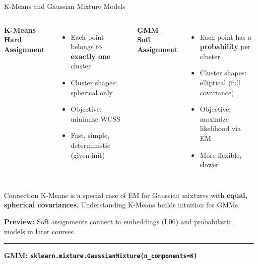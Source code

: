 \documentclass[8pt,aspectratio=169]{beamer}
\newcommand{\bottomnote}[1]{%
\vfill
\vspace{-2mm}
\textcolor{mllavender2}{\rule{\textwidth}{0.4pt}}
\vspace{1mm}
\footnotesize
\textbf{#1}
}
\newenvironment{compactlist}{%
  \begin{itemize}%
    \setlength{\itemsep}{2pt}%
    \setlength{\parskip}{0pt}%
    \setlength{\parsep}{0pt}%
}{%
  \end{itemize}%
}
\newcommand{\highlight}[1]{\textcolor{mlorange}{\textbf{#1}}}
\begin{document}
\begin{frame}[t]{K-Means and Gaussian Mixture Models}
\begin{columns}[T]
\small
\textbf{K-Means = Hard Assignment}

\footnotesize
\begin{compactlist}
\item \footnotesize Each point belongs to \highlight{exactly one} cluster
\item \footnotesize Cluster shapes: spherical only
\item \footnotesize Objective: minimize WCSS
\item \footnotesize Fast, simple, deterministic (given init)
\end{compactlist}

\small
\textbf{GMM = Soft Assignment}

\footnotesize
\begin{compactlist}
\item \footnotesize Each point has a \highlight{probability} per cluster
\item \footnotesize Cluster shapes: elliptical (full covariance)
\item \footnotesize Objective: maximize likelihood via EM
\item \footnotesize More flexible, slower
\end{compactlist}
\end{columns}

\vspace{3mm}
\begin{block}{Connection}
\footnotesize K-Means is a special case of EM for Gaussian mixtures with \highlight{equal, spherical covariances}. Understanding K-Means builds intuition for GMMs.
\end{block}

\vspace{2mm}
\footnotesize
\textbf{Preview:} Soft assignments connect to embeddings (L06) and probabilistic models in later courses.
\bottomnote{GMM: \texttt{sklearn.mixture.GaussianMixture(n\_components=K)}}
\end{frame}
\end{document}

